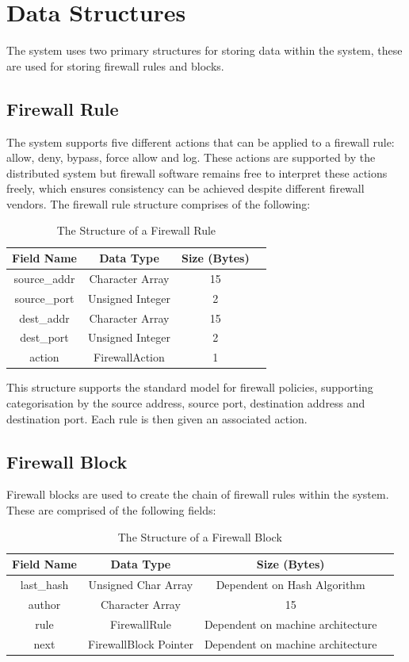 \documentclass[a4paper, 11pt]{report}
\begin{document}
\section{Data Structures}
The system uses two primary structures for storing data within the system, these are used for storing firewall rules and blocks.

\subsection{Firewall Rule} \label{rule}
The system supports five different actions that can be applied to a firewall rule: allow, deny, bypass, force allow and log.  These actions are supported by the distributed system but firewall software remains free to interpret these actions freely, which ensures consistency can be achieved despite different firewall vendors.
The firewall rule structure comprises of the following:

\begin{table}[H]
\centering
\begin{tabular}{ |c|c|c|c| } 
\hline
Field Name & Data Type & Size (Bytes) \\
\hline
source_addr & Character Array & 15 \\
source_port & Unsigned Integer & 2 \\
dest_addr & Character Array & 15 \\
dest_port & Unsigned Integer & 2 \\
action & FirewallAction & 1 \\
\hline
\end{tabular}
\caption{The Structure of a Firewall Rule}
\label{tab:rulestr}
\end{table}

This structure supports the standard model for firewall policies, supporting categorisation by the source address, source port, destination address and destination port. Each rule is then given an associated action.

\subsection{Firewall Block}
Firewall blocks are used to create the chain of firewall rules within the system. These are comprised of the following fields:

\begin{table}[H]
\centering
\begin{tabular}{ |c|c|c|c| } 
\hline
Field Name & Data Type & Size (Bytes) \\
\hline
last_hash & Unsigned Char Array & Dependent on Hash Algorithm \\ 
author & Character Array & 15 \\
rule & FirewallRule & Dependent on machine architecture \\
next & FirewallBlock Pointer & Dependent on machine architecture \\
\hline
\end{tabular}
\caption{The Structure of a Firewall Block}
\label{tab:firewallblock}
\end{table}
\end{document}
